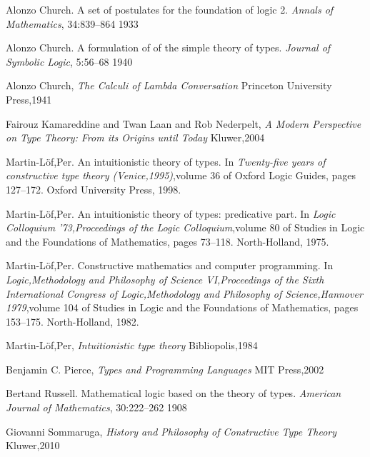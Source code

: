 \documentclass[12pt]{article}
\begin{document}
\begin{thebibliography}{99}

 {Alonzo Church}. {A set of postulates for the foundation of logic 2}. \emph{Annals of Mathematics}, {34}:{839--864} {1933}

 {Alonzo Church}. {A formulation of of the simple theory of types}. \emph{Journal of Symbolic Logic}, {5}:{56--68} {1940}

 {Alonzo Church}, \emph{{The Calculi of Lambda Conversation}}  {Princeton University Press},{1941}

 {Fairouz Kamareddine and Twan Laan and Rob Nederpelt}, \emph{{A Modern Perspective on Type Theory: From its Origins until Today}}  {Kluwer},{2004}

 {Martin-L{\"o}f,Per}. {An intuitionistic theory of types}. In \emph{Twenty-five years of constructive type theory ({V}enice,1995)},volume 36 of {Oxford Logic Guides}, pages {127--172}. {Oxford University Press}, 1998.

 {Martin-L{\"o}f,Per}. {An intuitionistic theory of types: predicative part}. In \emph{Logic Colloquium '73,Proceedings of the Logic Colloquium},volume 80 of {Studies in Logic and the Foundations of Mathematics}, pages {73--118}. {North-Holland}, 1975.

 {Martin-L{\"o}f,Per}. {Constructive mathematics and computer programming}. In \emph{Logic,Methodology and Philosophy of Science VI,Proceedings of the Sixth International Congress of Logic,Methodology and Philosophy of Science,Hannover 1979},volume 104 of {Studies in Logic and the Foundations of Mathematics}, pages {153--175}. {North-Holland}, 1982.

 {Martin-L{\"o}f,Per}, \emph{{Intuitionistic type theory}}  {Bibliopolis},{1984}

 {Benjamin C. Pierce}, \emph{{Types and Programming Languages}}  {MIT Press},2002

 {Bertand Russell}. {Mathematical logic based on the theory of types}. \emph{American Journal of Mathematics}, 30:{222--262} 1908

 {Giovanni Sommaruga}, \emph{{History and Philosophy of Constructive Type Theory}}  {Kluwer},{2010}

\end{thebibliography}
\end{document}
